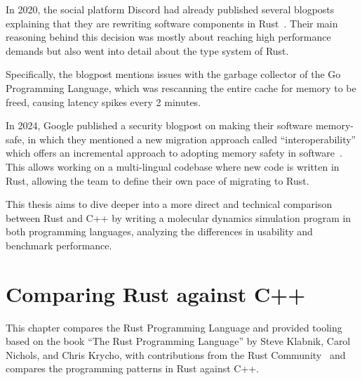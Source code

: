 \documentclass[11pt,
               a4paper,
               bibtotoc,
               idxtotoc,
               headsepline,
               footsepline,
               footexclude,
               BCOR12mm,
               DIV13,
               openany,   %
               ]
               {scrbook}
\begin{document}
In 2020, the social platform Discord had already published several blogposts explaining that they are rewriting software components in Rust~\cite{discord-moves-to-rust}. Their main reasoning behind this decision was mostly about reaching high performance demands but also went into detail about the type system of Rust.

Specifically, the blogpost mentions issues with the garbage collector of the Go Programming Language, which was rescanning the entire cache for memory to be freed, causing latency spikes every 2 minutes.



In 2024, Google published a security blogpost on making their software memory-safe, in which they mentioned a new migration approach called ``interoperability'' which offers an incremental approach to adopting memory safety in software~\cite{google-eliminating-memory-safety-vulnerabilities}. This allows working on a multi-lingual codebase where new code is written in Rust, allowing the team to define their own pace of migrating to Rust.

This thesis aims to dive deeper into a more direct and technical comparison between Rust and C++ by writing a molecular dynamics simulation program in both programming languages, analyzing the differences in usability and benchmark performance.

\chapter{Comparing Rust against C++}

This chapter compares the Rust Programming Language and provided tooling based on the book ``The Rust Programming Language'' by Steve Klabnik, Carol Nichols, and Chris Krycho, with contributions from the Rust Community~\cite{rust-book} and compares the programming patterns in Rust against C++.
\end{document}

